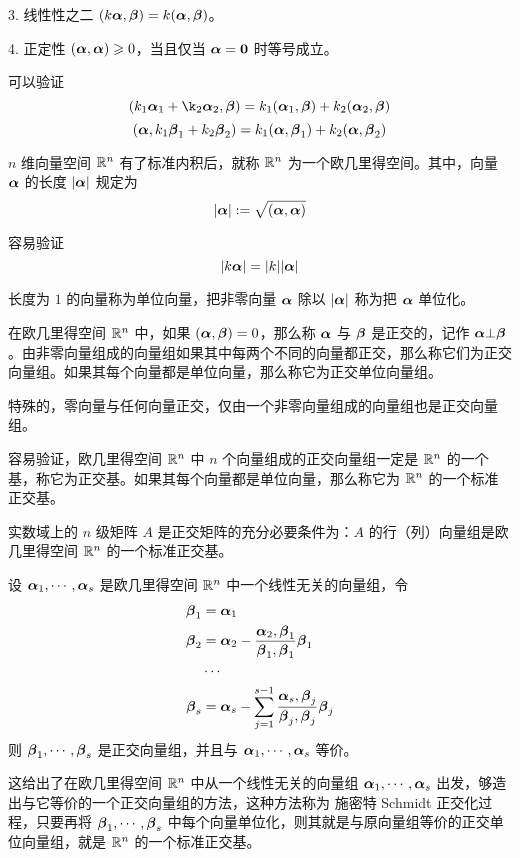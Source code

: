 3. 线性性之二 $(k\aaa,\bbb) = k(\aaa,\bbb)$。

4. 正定性 $(\aaa,\aaa)\geqslant 0$，当且仅当 $\aaa=\ling$ 时等号成立。

可以验证
$$(k_1\aaa_1+\k_2\aaa_2,\bbb) = k_1(\aaa_1,\bbb) + k_2(\aaa_2,\bbb)$$
$$(\aaa,k_1\bbb_1+k_2\bbb_2) = k_1(\aaa,\bbb_1) + k_2(\aaa,\bbb_2)$$

$n$ 维向量空间 $\RR^n$ 有了标准内积后，就称 $\RR^n$ 为一个欧几里得空间。其中，向量 $\aaa$ 的长度 $|\aaa|$ 规定为
$$|\aaa| := \sqrt{(\aaa,\aaa)}$$

容易验证
$$|k\aaa| = |k||\aaa|$$

长度为 $1$ 的向量称为单位向量，把非零向量 $\aaa$ 除以 $|\aaa|$ 称为把 $\aaa$ 单位化。

在欧几里得空间 $\RR^n$ 中，如果 $(\aaa,\bbb)=0$，那么称 $\aaa$ 与 $\bbb$ 是正交的，记作 $\aaa \bot \bbb$。由非零向量组成的向量组如果其中每两个不同的向量都正交，那么称它们为正交向量组。如果其每个向量都是单位向量，那么称它为正交单位向量组。

特殊的，零向量与任何向量正交，仅由一个非零向量组成的向量组也是正交向量组。

容易验证，欧几里得空间 $\RR^n$ 中 $n$ 个向量组成的正交向量组一定是 $\RR^n$ 的一个基，称它为正交基。如果其每个向量都是单位向量，那么称它为 $\RR^n$ 的一个标准正交基。

\begin{theorem}
    实数域上的 $n$ 级矩阵 $A$ 是正交矩阵的充分必要条件为：$A$ 的行（列）向量组是欧几里得空间 $\RR^n$ 的一个标准正交基。
\end{theorem}

\begin{theorem}
    设 $\aaa_1,\cdots,\aaa_s$ 是欧几里得空间 $\RR^n$ 中一个线性无关的向量组，令
    \begin{equation*}
        \begin{aligned}
            \bbb_1&=\aaa_1\\
            \bbb_2&=\aaa_2 - \frac{\aaa_2,\bbb_1}{\bbb_1,\bbb_1}\bbb_1\\
            &\cdots \\
            \bbb_s &= \aaa_s-\sum_{j=1}^{s-1}\frac{\aaa_s,\bbb_j}{\bbb_j,\bbb_j}\bbb_j
        \end{aligned}
    \end{equation*}
    则 $\bbb_1,\cdots,\bbb_s$ 是正交向量组，并且与 $\aaa_1,\cdots,\aaa_s$ 等价。
\end{theorem}

这给出了在欧几里得空间 $\RR^n$ 中从一个线性无关的向量组 $\aaa_1,\cdots,\aaa_s$ 出发，够造出与它等价的一个正交向量组的方法，这种方法称为 施密特 Schmidt 正交化过程，只要再将 $\bbb_1,\cdots,\bbb_s$ 中每个向量单位化，则其就是与原向量组等价的正交单位向量组，就是 $\RR^n$ 的一个标准正交基。

